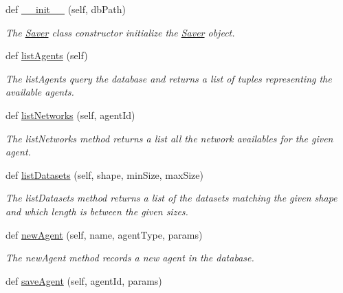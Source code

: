 \begin{DoxyCompactItemize}
\item 
def \hyperlink{classDQN-Deepmind-NIPS-2013_1_1Saver_1_1Saver_ac1c5a74d16e09f25b884196bda20f70a}{\+\_\+\+\_\+init\+\_\+\+\_\+} (self, db\+Path)
\begin{DoxyCompactList}\small\item\em The \hyperlink{classDQN-Deepmind-NIPS-2013_1_1Saver_1_1Saver}{Saver} class constructor initialize the \hyperlink{classDQN-Deepmind-NIPS-2013_1_1Saver_1_1Saver}{Saver} object. \end{DoxyCompactList}\item 
def \hyperlink{classDQN-Deepmind-NIPS-2013_1_1Saver_1_1Saver_a4f61e8fbd52eef88616ef8e9ef0fab2b}{list\+Agents} (self)
\begin{DoxyCompactList}\small\item\em The list\+Agents query the database and returns a list of tuples representing the available agents. \end{DoxyCompactList}\item 
def \hyperlink{classDQN-Deepmind-NIPS-2013_1_1Saver_1_1Saver_a8deee83c5bcdd58d10abc7dadeb8d153}{list\+Networks} (self, agent\+Id)
\begin{DoxyCompactList}\small\item\em The list\+Networks method returns a list all the network availables for the given agent. \end{DoxyCompactList}\item 
def \hyperlink{classDQN-Deepmind-NIPS-2013_1_1Saver_1_1Saver_a47c6eac5868ed0525a258211a4d75cd9}{list\+Datasets} (self, shape, min\+Size, max\+Size)
\begin{DoxyCompactList}\small\item\em The list\+Datasets method returns a list of the datasets matching the given shape and which length is between the given sizes. \end{DoxyCompactList}\item 
def \hyperlink{classDQN-Deepmind-NIPS-2013_1_1Saver_1_1Saver_a21a3603e2a8e8d12d60a2640b224b952}{new\+Agent} (self, name, agent\+Type, params)
\begin{DoxyCompactList}\small\item\em The new\+Agent method records a new agent in the database. \end{DoxyCompactList}\item 
def \hyperlink{classDQN-Deepmind-NIPS-2013_1_1Saver_1_1Saver_aa0d2a62b7e514dc527745f846924e70e}{save\+Agent} (self, agent\+Id, params)

\end{DoxyCompactItemize}
